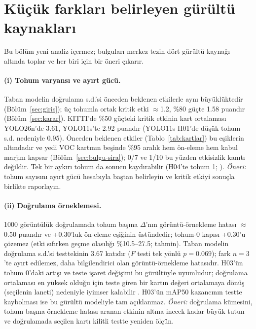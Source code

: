 \documentclass[pdflatex,iicol,sn-mathphys-num]{sn-jnl}
\begin{document}
\section{Küçük farkları belirleyen gürültü kaynakları}\label{sec:gurultu}\label{sec:tartisma}

Bu bölüm yeni analiz içermez; bulguları merkez tezin dört gürültü kaynağı altında toplar ve her biri için bir öneri çıkarır.

\paragraph{(i) Tohum varyansı ve ayırt gücü.}
Taban modelin doğrulama s.d.'si önceden beklenen etkilerle aynı büyüklüktedir (Bölüm~\ref{sec:giris}); üç tohumla ortak kritik etki $\approx$1.2, \%80 güçte 1.58 puandır (Bölüm~\ref{sec:karar}). KITTI'de \%50 güçteki kritik etkinin kart ortalaması YOLO26n'de 3.61, YOLO11s'te 2.92 puandır (YOLO11s H01'de düşük tohum s.d. nedeniyle 0.95). Önceden beklenen etkiler (Tablo~\ref{tab:kartlar}) bu eşiklerin altındadır ve yedi VOC kartının beşinde \%95 aralık hem ön-eleme hem kabul marjını kapsar (Bölüm~\ref{sec:bulgu-sira}); 0/7 ve 1/10 bu yüzden etkisizlik kanıtı değildir. Tek bir aykırı tohum da sonucu kaydırabilir (H04'te tohum 1; \cite{picard_2021_seed}). \emph{Öneri:} tohum sayısını ayırt gücü hesabıyla baştan belirleyin ve kritik etkiyi sonuçla birlikte raporlayın.

\paragraph{(ii) Doğrulama örneklemesi.}
1000 görüntülük doğrulamada tohum başına $\Delta$'nın görüntü-örnekleme hatası $\approx$0.50 puandır ve +0.30'luk ön-eleme eşiğinin üstündedir; tohum-0 kapısı +0.30'u çözemez (etki sıfırken geçme olasılığı \%10.5--27.5; tahmin). Taban modelin doğrulama s.d.'si testtekinin 3.67 katıdır ($F$ testi tek yönlü $p=0.069$); fark $n=3$'te ayırt edilemez, daha bilgilendirici olan görüntü-örnekleme hatasıdır. H03'ün tohum 0'daki artışı ve teste işaret değişimi bu gürültüyle uyumludur; doğrulama ortalaması en yüksek olduğu için teste giren bir kartın değeri ortalamaya dönüş (seçilenin laneti) nedeniyle iyimser kalabilir \cite{cawley_2010_overfitting,picard_2021_seed,bouthillier_2021_variance}. H03'ün mAP50 kazancının testte kaybolması ise bu gürültü modeliyle tam açıklanmaz. \emph{Öneri:} doğrulama kümesini, tohum başına örnekleme hatası aranan etkinin altına inecek kadar büyük tutun ve doğrulamada seçilen kartı kilitli testte yeniden ölçün.
\end{document}
